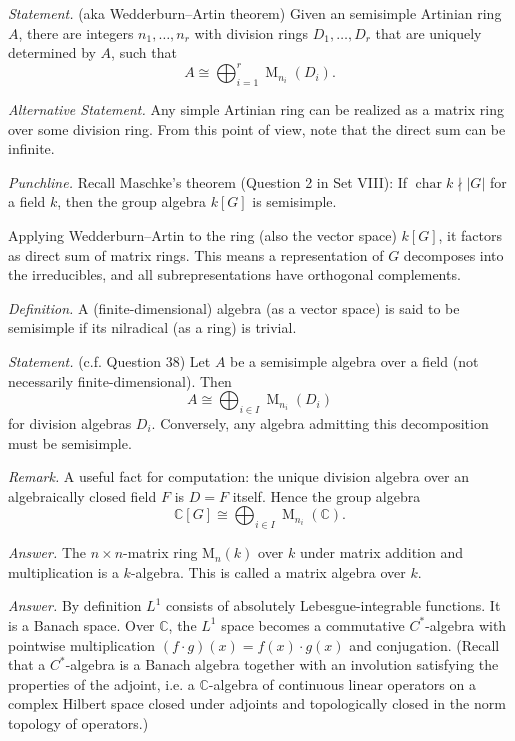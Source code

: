 \documentclass{mathproblems}
\newcommand\C{\mathbb{C}}
\begin{document}
\begin{questions}

\textit{Statement.} (aka Wedderburn--Artin theorem) Given an semisimple Artinian ring $A$, there are integers $n_1,\ldots,n_r$ with division rings $D_1,\ldots,D_r$ that are uniquely determined by $A$, such that
$$
A\cong \bigoplus_{i=1}^r \operatorname{M}_{n_i}(D_i).
$$

\textit{Alternative Statement.} Any simple Artinian ring can be realized as a matrix ring over some division ring. From this point of view, note that the direct sum can be infinite.

{\color{violet}
\textit{Punchline.} Recall Maschke's theorem (Question 2 in Set VIII): If $\operatorname{char}k\nmid |G|$ for a field $k$, then the group algebra $k[G]$ is semisimple.

Applying Wedderburn--Artin to the ring (also the vector space) $k[G]$, it factors as direct sum of matrix rings. This means a representation of $G$ decomposes into the irreducibles, and all subrepresentations have orthogonal complements.
}


\textit{Definition.} A (finite-dimensional) algebra (as a vector space) is said to be semisimple if its nilradical (as a ring) is trivial.

\textit{Statement.} (c.f. Question 38) Let $A$ be a semisimple algebra over a field (not necessarily finite-dimensional). Then
$$
A\cong \bigoplus_{i\in I} \operatorname{M}_{n_i}(D_i)
$$
for division algebras $D_i$. Conversely, any algebra admitting this decomposition must be semisimple.

\textit{Remark.} A useful fact for computation: the unique division algebra over an algebraically closed field $F$ is $D=F$ itself. Hence the group algebra
$$
\C[G]\cong \bigoplus_{i\in I} \operatorname{M}_{n_i}(\C).
$$


\textit{Answer.} The $n\times n$-matrix ring $\mathrm{M}_n(k)$ over $k$ under matrix addition and multiplication is a $k$-algebra. This is called a matrix algebra over $k$.


\textit{Answer.} By definition $L^1$ consists of absolutely Lebesgue-integrable functions. It is a Banach space. Over $\C$, the $L^1$ space becomes a commutative $C^*$-algebra with pointwise multiplication $(f\cdot g)(x)=f(x)\cdot g(x)$ and conjugation. (Recall that a $C^*$-algebra is a Banach algebra together with an involution satisfying the properties of the adjoint, i.e. a $\C$-algebra of continuous linear operators on a complex Hilbert space closed under adjoints and topologically closed in the norm topology of operators.)


\end{questions}
\end{document}

